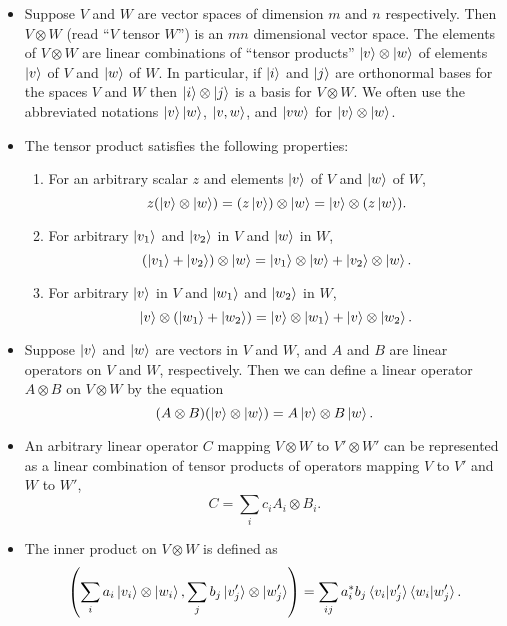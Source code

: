 \documentclass{article}
\begin{document}
\begin{itemize}
  \item Suppose $V$ and $W$ are vector spaces of dimension $m$ and $n$ respectively. Then $V \otimes W$ (read ``$V$ tensor $W$'') is an $m n$ dimensional vector space. The elements of $V \otimes W$ are linear combinations of ``tensor products'' $\ket{v} \otimes \ket{w}$ of elements $\ket{v}$ of $V$ and $\ket{w}$ of $W$. In particular, if $\ket{i}$ and $\ket{j}$ are orthonormal bases for the spaces $V$ and $W$ then $\ket{i} \otimes \ket{j}$ is a basis for $V \otimes W$. We often use the abbreviated notations $\ket{v} \ket{w}$, $\ket{v, w}$, and $\ket{v w}$ for $\ket{v} \otimes \ket{w}$.

  \item The tensor product satisfies the following properties:

        \begin{enumerate}
          \item For an arbitrary scalar $z$ and elements $\ket{v}$ of $V$ and $\ket{w}$ of $W$, \[z (\ket{v} \otimes \ket{w}) = (z \ket{v}) \otimes \ket{w} = \ket{v} \otimes (z \ket{w}).\]

          \item For arbitrary $\ket{v_1}$ and $\ket{v_2}$ in $V$ and $\ket{w}$ in $W$, \[(\ket{v_1} + \ket{v_2}) \otimes \ket{w} = \ket{v_1} \otimes \ket{w} + \ket{v_2} \otimes \ket{w}.\]

          \item For arbitrary $\ket{v}$ in $V$ and $\ket{w_1}$ and $\ket{w_2}$ in $W$, \[\ket{v} \otimes (\ket{w_1} + \ket{w_2}) = \ket{v} \otimes \ket{w_1} + \ket{v} \otimes \ket{w_2}.\]
        \end{enumerate}

  \item Suppose $\ket{v}$ and $\ket{w}$ are vectors in $V$ and $W$, and $A$ and $B$ are linear operators on $V$ and $W$, respectively. Then we can define a linear operator $A \otimes B$ on $V \otimes W$ by the equation \[(A \otimes B) (\ket{v} \otimes \ket{w}) = A \ket{v} \otimes B \ket{w}.\]

  \item An arbitrary linear operator $C$ mapping $V \otimes W$ to $V' \otimes W'$ can be represented as a linear combination of tensor products of operators mapping $V$ to $V'$ and $W$ to $W'$, \[C = \sum_i c_i A_i \otimes B_i.\]

  \item The inner product on $V \otimes W$ is defined as \[\left( \sum_i a_i \ket{v_i} \otimes \ket{w_i}, \sum_j b_j \ket{v_j'} \otimes \ket{w_j'} \right) = \sum_{i j} a_i^* b_j \braket{v_i | v_j'} \braket{w_i | w_j'}.\]


\end{itemize}
\end{document}
